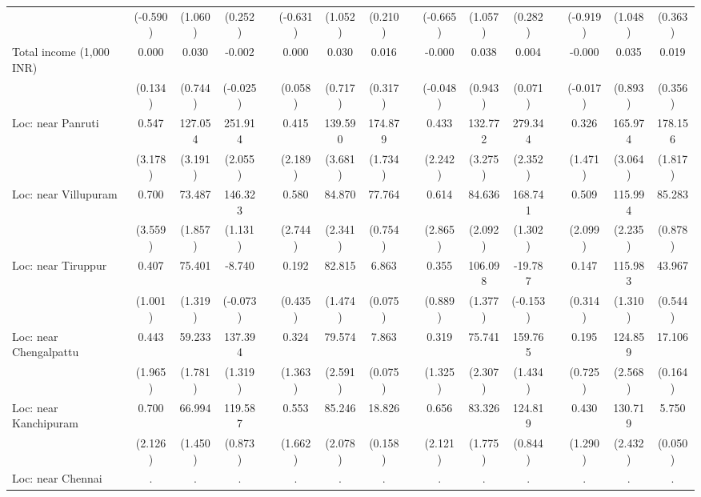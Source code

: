 {\begin{longtable}{@{\extracolsep{\fill}}lccccccccccccccc}
          & (-0.590) & (1.060) & (0.252) &       & (-0.631) & (1.052) & (0.210) &       & (-0.665) & (1.057) & (0.282) &       & (-0.919) & (1.048) & (0.363) \\
    Total income (1,000 INR) & 0.000 & 0.030 & -0.002 &       & 0.000 & 0.030 & 0.016 &       & -0.000 & 0.038 & 0.004 &       & -0.000 & 0.035 & 0.019 \\
          & (0.134) & (0.744) & (-0.025) &       & (0.058) & (0.717) & (0.317) &       & (-0.048) & (0.943) & (0.071) &       & (-0.017) & (0.893) & (0.356) \\
    Loc: near Panruti & 0.547 & 127.054 & 251.914 &       & 0.415 & 139.590 & 174.879 &       & 0.433 & 132.772 & 279.344 &       & 0.326 & 165.974 & 178.156 \\
          & (3.178) & (3.191) & (2.055) &       & (2.189) & (3.681) & (1.734) &       & (2.242) & (3.275) & (2.352) &       & (1.471) & (3.064) & (1.817) \\
    Loc: near Villupuram & 0.700 & 73.487 & 146.323 &       & 0.580 & 84.870 & 77.764 &       & 0.614 & 84.636 & 168.741 &       & 0.509 & 115.994 & 85.283 \\
          & (3.559) & (1.857) & (1.131) &       & (2.744) & (2.341) & (0.754) &       & (2.865) & (2.092) & (1.302) &       & (2.099) & (2.235) & (0.878) \\
    Loc: near Tiruppur & 0.407 & 75.401 & -8.740 &       & 0.192 & 82.815 & 6.863 &       & 0.355 & 106.098 & -19.787 &       & 0.147 & 115.983 & 43.967 \\
          & (1.001) & (1.319) & (-0.073) &       & (0.435) & (1.474) & (0.075) &       & (0.889) & (1.377) & (-0.153) &       & (0.314) & (1.310) & (0.544) \\
    Loc: near Chengalpattu & 0.443 & 59.233 & 137.394 &       & 0.324 & 79.574 & 7.863 &       & 0.319 & 75.741 & 159.765 &       & 0.195 & 124.859 & 17.106 \\
          & (1.965) & (1.781) & (1.319) &       & (1.363) & (2.591) & (0.075) &       & (1.325) & (2.307) & (1.434) &       & (0.725) & (2.568) & (0.164) \\
    Loc: near Kanchipuram & 0.700 & 66.994 & 119.587 &       & 0.553 & 85.246 & 18.826 &       & 0.656 & 83.326 & 124.819 &       & 0.430 & 130.719 & 5.750 \\
          & (2.126) & (1.450) & (0.873) &       & (1.662) & (2.078) & (0.158) &       & (2.121) & (1.775) & (0.844) &       & (1.290) & (2.432) & (0.050) \\
    Loc: near Chennai & .     & .     & .     &       & .     & .     & .     &       & .     & .     & .     &       & .     & .     & . \\

\end{longtable}}
